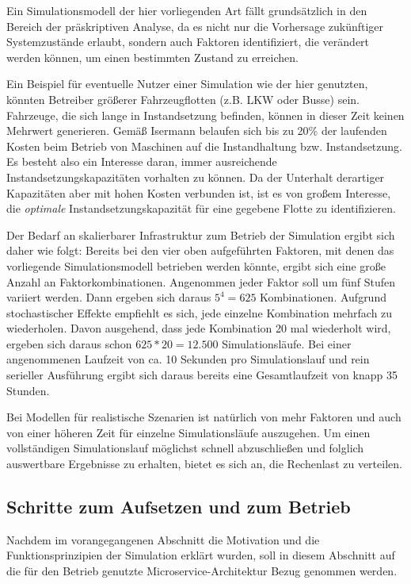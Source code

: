 \documentclass[11pt,a4paper]{article}
\begin{document}
Ein Simulationsmodell der hier vorliegenden Art fällt grundsätzlich in den Bereich der präskriptiven Analyse, 
da es nicht nur die Vorhersage zukünftiger Systemzustände erlaubt, sondern auch Faktoren identifiziert,
die verändert werden können, um einen bestimmten Zustand zu erreichen.

Ein Beispiel für eventuelle Nutzer einer Simulation wie der hier genutzten, könnten 
Betreiber größerer Fahrzeugflotten (z.B. LKW oder Busse) sein. 
Fahrzeuge, die sich lange in Instandsetzung befinden, können in dieser Zeit keinen Mehrwert generieren.
Gemäß Isermann \cite{Isermann_2011} belaufen sich bis zu 20\% der laufenden Kosten beim Betrieb von Maschinen auf
die Instandhaltung bzw. Instandsetzung. %
Es besteht also ein Interesse daran, immer ausreichende Instandsetzungskapazitäten vorhalten zu können.
Da der Unterhalt derartiger Kapazitäten aber mit hohen Kosten verbunden ist, ist es von großem
Interesse, die \emph{optimale} Instandsetzungskapazität für eine gegebene Flotte zu identifizieren.

Der Bedarf an skalierbarer Infrastruktur zum Betrieb der Simulation ergibt sich daher wie folgt:
Bereits bei den vier oben aufgeführten Faktoren, mit denen das vorliegende Simulationsmodell betrieben werden könnte,
ergibt sich eine große Anzahl an Faktorkombinationen.
Angenommen jeder Faktor soll um fünf Stufen variiert werden. Dann ergeben sich daraus
$5^4 = 625$ Kombinationen. Aufgrund stochastischer Effekte empfiehlt es sich, jede einzelne
Kombination mehrfach zu wiederholen. Davon ausgehend, dass jede Kombination 20 mal wiederholt wird,
ergeben sich daraus schon $625 * 20 = 12.500$ Simulationsläufe. Bei einer angenommenen Laufzeit von ca. 10 Sekunden
pro Simulationslauf und rein serieller Ausführung ergibt sich daraus bereits eine Gesamtlaufzeit von
knapp 35 Stunden.

Bei Modellen für realistische Szenarien ist natürlich von mehr Faktoren und auch von einer höheren Zeit 
für einzelne Simulationsläufe auszugehen. Um einen vollständigen Simulationslauf möglichst schnell abzuschließen
und folglich auswertbare Ergebnisse zu erhalten, bietet es sich an, die Rechenlast zu verteilen.  

\subsection{Schritte zum Aufsetzen und zum Betrieb}
Nachdem im vorangegangenen Abschnitt die Motivation und die Funktionsprinzipien der Simulation erklärt wurden,
soll in diesem Abschnitt auf die für den Betrieb genutzte Microservice-Architektur Bezug genommen werden.
\end{document}
